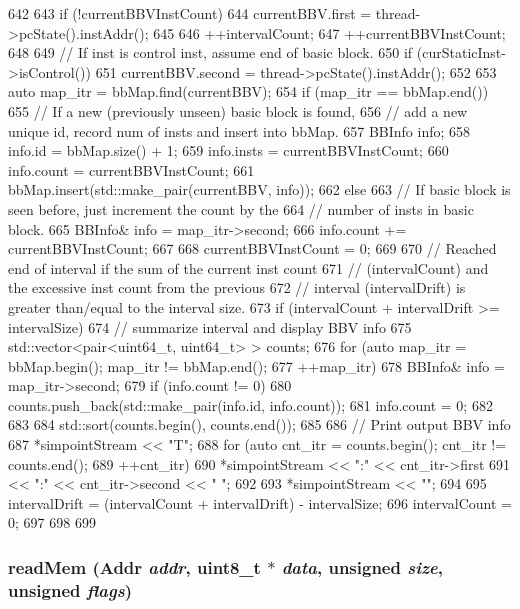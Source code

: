 \begin{DoxyCode}
642 {
643     if (!currentBBVInstCount)
644         currentBBV.first = thread->pcState().instAddr();
645 
646     ++intervalCount;
647     ++currentBBVInstCount;
648 
649     // If inst is control inst, assume end of basic block.
650     if (curStaticInst->isControl()) {
651         currentBBV.second = thread->pcState().instAddr();
652 
653         auto map_itr = bbMap.find(currentBBV);
654         if (map_itr == bbMap.end()){
655             // If a new (previously unseen) basic block is found,
656             // add a new unique id, record num of insts and insert into bbMap.
657             BBInfo info;
658             info.id = bbMap.size() + 1;
659             info.insts = currentBBVInstCount;
660             info.count = currentBBVInstCount;
661             bbMap.insert(std::make_pair(currentBBV, info));
662         } else {
663             // If basic block is seen before, just increment the count by the
664             // number of insts in basic block.
665             BBInfo& info = map_itr->second;
666             info.count += currentBBVInstCount;
667         }
668         currentBBVInstCount = 0;
669 
670         // Reached end of interval if the sum of the current inst count
671         // (intervalCount) and the excessive inst count from the previous
672         // interval (intervalDrift) is greater than/equal to the interval size.
673         if (intervalCount + intervalDrift >= intervalSize) {
674             // summarize interval and display BBV info
675             std::vector<pair<uint64_t, uint64_t> > counts;
676             for (auto map_itr = bbMap.begin(); map_itr != bbMap.end();
677                     ++map_itr) {
678                 BBInfo& info = map_itr->second;
679                 if (info.count != 0) {
680                     counts.push_back(std::make_pair(info.id, info.count));
681                     info.count = 0;
682                 }
683             }
684             std::sort(counts.begin(), counts.end());
685 
686             // Print output BBV info
687             *simpointStream << "T";
688             for (auto cnt_itr = counts.begin(); cnt_itr != counts.end();
689                     ++cnt_itr) {
690                 *simpointStream << ":" << cnt_itr->first
691                                 << ":" << cnt_itr->second << " ";
692             }
693             *simpointStream << "\n";
694 
695             intervalDrift = (intervalCount + intervalDrift) - intervalSize;
696             intervalCount = 0;
697         }
698     }
699 }
\end{DoxyCode}
\hypertarget{classAtomicSimpleCPU_a66191b2d8a45050b7df3c3efa7bb07c6}{
\subsubsection[{readMem}]{ readMem ({\bf Addr} {\em addr}, \/  uint8\_\-t $\ast$ {\em data}, \/  unsigned {\em size}, \/  unsigned {\em flags})}}
\label{classAtomicSimpleCPU_a66191b2d8a45050b7df3c3efa7bb07c6}



